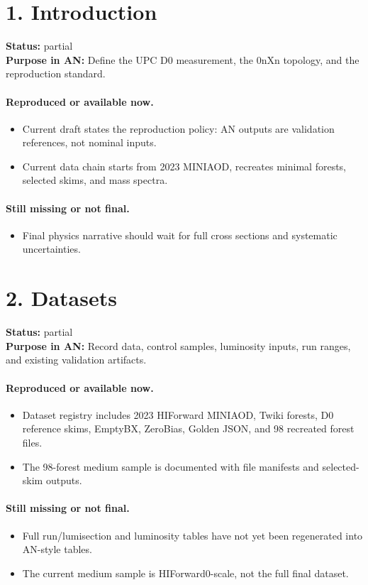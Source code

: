 \documentclass[11pt]{article}
\begin{document}
\section*{1. Introduction}
\textbf{Status:} partial\\
\textbf{Purpose in AN:} Define the UPC D0 measurement, the 0nXn topology, and the reproduction standard.
\paragraph{Reproduced or available now.}
\begin{itemize}
\item Current draft states the reproduction policy: AN outputs are validation references, not nominal inputs.
\item Current data chain starts from 2023 MINIAOD, recreates minimal forests, selected skims, and mass spectra.
\end{itemize}
\paragraph{Still missing or not final.}
\begin{itemize}
\item Final physics narrative should wait for full cross sections and systematic uncertainties.
\end{itemize}
\section*{2. Datasets}
\textbf{Status:} partial\\
\textbf{Purpose in AN:} Record data, control samples, luminosity inputs, run ranges, and existing validation artifacts.
\paragraph{Reproduced or available now.}
\begin{itemize}
\item Dataset registry includes 2023 HIForward MINIAOD, Twiki forests, D0 reference skims, EmptyBX, ZeroBias, Golden JSON, and 98 recreated forest files.
\item The 98-forest medium sample is documented with file manifests and selected-skim outputs.
\end{itemize}
\paragraph{Still missing or not final.}
\begin{itemize}
\item Full run/lumisection and luminosity tables have not yet been regenerated into AN-style tables.
\item The current medium sample is HIForward0-scale, not the full final dataset.
\end{itemize}
\end{document}
